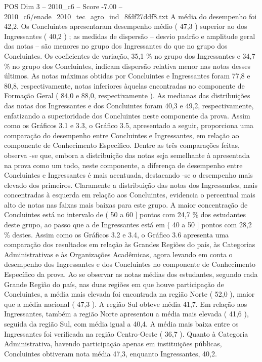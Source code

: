 \begin{textsample}{POS Dim 3 – 2010\_c6 – Score -7.00 – 2010\_c6/enade\_2010\_tec\_agro\_ind\_8fdf27ddf8.txt}
A média do desempenho foi 42,2.
Os Concluintes apresentaram desempenho médio ( 47,3 ) superior ao dos Ingressantes ( 40,2 ) ; as medidas de dispersão – desvio padrão e amplitude geral das notas – são menores no grupo dos Ingressantes do que no grupo dos Concluintes.
Os coeficientes de variação, 35,1 \% no grupo dos Ingressantes e 34,7 \% no grupo dos Concluintes, indicam dispersão relativa menor nas notas desses últimos.
As notas máximas obtidas por Concluintes e Ingressantes foram 77,8 e 80,8, respectivamente, notas inferiores àquelas encontradas no componente de Formação Geral ( 84,0 e 88,0, respectivamente ).
As medianas das distribuições das notas dos Ingressantes e dos Concluintes foram 40,3 e 49,2, respectivamente, enfatizando a superioridade dos Concluintes neste componente da prova.
Assim como os Gráficos 3.1 e 3.3, o Gráfico 3.5, apresentado a seguir, proporciona uma comparação do desempenho entre Concluintes e Ingressantes, em relação ao componente de Conhecimento Específico.
Dentre as três comparações feitas, observa -se que, embora a distribuição das notas seja semelhante à apresentada na prova como um todo, neste componente, a diferença de desempenho entre Concluintes e Ingressantes é mais acentuada, destacando -se o desempenho mais elevado dos primeiros.
Claramente a distribuição das notas dos Ingressantes, mais concentradas à esquerda em relação aos Concluintes, evidencia o percentual mais alto de notas nas faixas mais baixas para este grupo.
A maior concentração de Concluintes está no intervalo de ( 50 a 60 ] pontos com 24,7 \% dos estudantes deste grupo, ao passo que a de Ingressantes está em ( 40 a 50 ] pontos com 28,2 \% destes.
Assim como os Gráficos 3.2 e 3.4, o Gráfico 3.6 apresenta uma comparação dos resultados em relação às Grandes Regiões do país, às Categorias Administrativas e às Organizações Acadêmicas, agora levando em conta o desempenho dos Ingressantes e dos Concluintes no componente de Conhecimento Específico da prova.
Ao se observar as notas médias dos estudantes, segundo cada Grande Região do país, nas duas regiões em que houve participação de Concluintes, a média mais elevada foi encontrada na região Norte ( 52,0 ), maior que a média nacional ( 47,3 ).
A região Sul obteve média 41,7.
Em relação aos Ingressantes, também a região Norte apresentou a média mais elevada ( 41,6 ), seguida da região Sul, com média igual a 40,4.
A média mais baixa entre os Ingressantes foi verificada na região Centro-Oeste ( 36,7 ).
Quanto à Categoria Administrativa, havendo participação apenas em instituições públicas, Concluintes obtiveram nota média 47,3, enquanto Ingressantes, 40,2.

\end{textsample}
